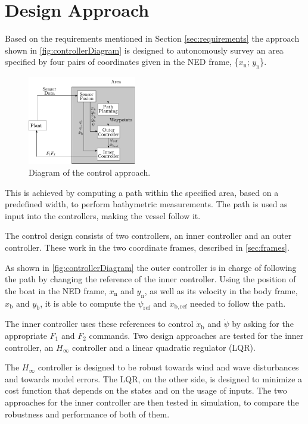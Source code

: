 \chapter{Design Approach} \label{chap:designaproach}
Based on the requirements mentioned in Section \ref{sec:requirements} the approach shown in \autoref{fig:controllerDiagram} is designed to autonomously survey an area specified by four pairs of coordinates given in the NED frame, \{$x_\mathrm{n}$; $y_\mathrm{n}$\}.
\begin{figure}[H]
    \includegraphics[width=0.42\textwidth]{figures/controllerDiagram2}
    \caption{Diagram of the control approach.}
    \label{fig:controllerDiagram}
\end{figure}

This is achieved by computing a path within the specified area, based on a predefined width, to perform bathymetric measurements. The path is used as input into the controllers, making the vessel follow it. 

The control design consists of two controllers, an inner controller and an outer controller. These work in the two coordinate frames, described in \autoref{sec:frames}.

As shown in \autoref{fig:controllerDiagram} the outer controller is in charge of following the path by changing the reference of the inner controller. Using the position of the boat in the NED frame, $x_\mathrm{n}$ and $y_\mathrm{n}$, as well as its velocity in the body frame, $x_\mathrm{b}$ and $y_\mathrm{b}$, it is able to compute the $\psi_\mathrm{ref}$ and $\dot{x}_\mathrm{b,ref}$ needed to follow the path. 

The inner controller uses these references to control $\dot{x}_\mathrm{b}$ and $\dot{\psi}$ by asking for the appropriate $F_1$ and $F_2$ commands. Two design approaches are tested for the inner controller, an $H_{\infty}$ controller and a linear quadratic regulator (LQR).

The $H_{\infty}$ controller is designed to be robust towards wind and wave disturbances and towards model errors. The LQR, on the other side, is designed to minimize a cost function that depends on the states and on the usage of inputs. The two approaches for the inner controller are then tested in simulation, to compare the robustness and performance of both of them.

